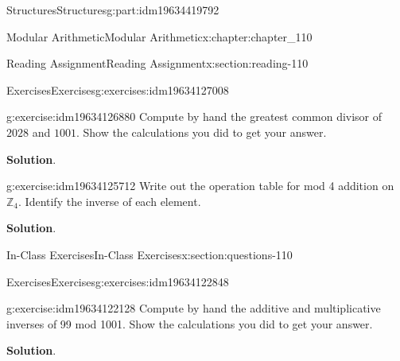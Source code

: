 \documentclass[oneside,10pt,]{book}
\newcommand{\blocktitlefont}{\relax}
\numberwithin{equation}{section}
\begin{document}
\begin{partptx}{Structures}{}{Structures}{}{}{g:part:idm19634419792}
\begin{chapterptx}{Modular Arithmetic}{}{Modular Arithmetic}{}{}{x:chapter:chapter_110}
\begin{sectionptx}{Reading Assignment}{}{Reading Assignment}{}{}{x:section:reading-110}
\typeout{************************************************}
\typeout{************************************************}
%
\begin{exercises-subsection-numberless}{Exercises}{}{Exercises}{}{}{g:exercises:idm19634127008}
\par\medskip\noindent%
%
\begin{exercisegroup}
\begin{divisionexerciseeg}{1}{}{}{g:exercise:idm19634126880}%
Compute by hand the greatest common divisor of \(2028\)  and \(1001\).  Show the calculations you did to get your answer.%
\par\smallskip%
\noindent\textbf{\blocktitlefont Solution}.\hypertarget{g:solution:idm19634126048}{}\quad{}%
\end{divisionexerciseeg}%
\begin{divisionexerciseeg}{2}{}{}{g:exercise:idm19634125712}%
Write out the operation table for mod 4 addition on \(\mathbb{Z}_4\).  Identify the inverse of each element.%
\par\smallskip%
\noindent\textbf{\blocktitlefont Solution}.\hypertarget{g:solution:idm19634124224}{}\quad{}%
\end{divisionexerciseeg}%
\end{exercisegroup}
\par\medskip\noindent
\end{exercises-subsection-numberless}
\end{sectionptx}
%
%
\typeout{************************************************}
\typeout{************************************************}
%
\begin{sectionptx}{In-Class Exercises}{}{In-Class Exercises}{}{}{x:section:questions-110}
%
%
%
\typeout{************************************************}
\typeout{************************************************}
%
\begin{exercises-subsection-numberless}{Exercises}{}{Exercises}{}{}{g:exercises:idm19634122848}
\par\medskip\noindent%
%
\begin{exercisegroup}
\begin{divisionexerciseeg}{1}{}{}{g:exercise:idm19634122128}%
Compute by hand the additive and multiplicative inverses of 99 mod 1001. Show the calculations you did to get your answer.%
\par\smallskip%
\noindent\textbf{\blocktitlefont Solution}.\hypertarget{g:solution:idm19634121920}{}\quad{}%

\end{divisionexerciseeg}
\end{exercisegroup}
\end{exercises-subsection-numberless}
\end{sectionptx}
\end{chapterptx}
\end{partptx}
\end{document}

